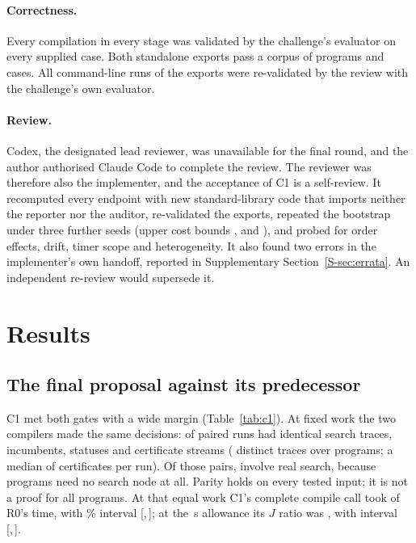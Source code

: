 \documentclass[11pt,a4paper]{article}
\newcommand{\ci}[2]{[#1,\,#2]}
\begin{document}
\paragraph{Correctness.} Every compilation in every stage was validated by the
challenge's evaluator on every supplied case. Both standalone exports pass a
corpus of  programs and  cases. All
 command-line runs of the exports were re-validated by the review
with the challenge's own evaluator.

\paragraph{Review.} Codex, the designated lead reviewer, was unavailable for the
final round, and the author authorised Claude Code to complete the review. The
reviewer was therefore also the implementer, and the acceptance of C1 is a
self-review. It recomputed every endpoint with new standard-library code that
imports neither the reporter nor the auditor, re-validated the exports, repeated
the bootstrap under three further seeds (upper cost bounds ,
 and ), and probed for order effects, drift,
timer scope and heterogeneity. It also found two errors in the implementer's own
handoff, reported in Supplementary Section~\ref{S-sec:errata}. An independent
re-review would supersede it.

\section{Results}\label{sec:results}

\subsection{The final proposal against its predecessor}
C1 met both gates with a wide margin (Table~\ref{tab:c1}). At fixed work the two
compilers made the same decisions:  of  paired runs
had identical search traces, incumbents, statuses and certificate streams
( distinct traces over  programs; a median of
 certificates per run). Of those pairs,  involve real
search, because  programs need no search node at all. Parity holds on
every tested input; it is not a proof for all programs. At that equal work C1's
complete compile call took  of R0's time, with \% interval
\ci{}{}; at the \,s allowance its $J$ ratio was ,
with interval \ci{}{}.
\end{document}
